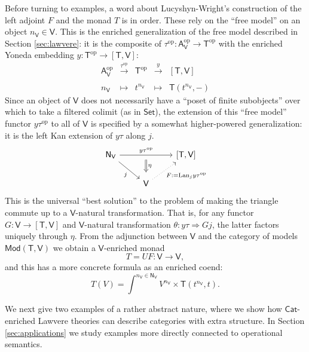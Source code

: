 \documentclass{amsart}
\theoremstyle{definition}
\newcommand{\Set}{\mathsf{Set}}
\newcommand{\Cat}{\mathsf{Cat}}
\newcommand{\Mod}{\mathsf{Mod}}
\newcommand{\NN}{\mathsf{N}}
\newcommand{\A}{\mathsf{A}}
\newcommand{\V}{\mathsf{V}}
\newcommand{\T}{\mathsf{T}}
\newcommand{\op}{\mathrm{op}}
\newcommand{\maps}{\colon}
\begin{document}
Before turning to examples, a word about Lucyshyn-Wright's construction of the left adjoint $F$ and the monad $T$ is in order.  These rely on the ``free model'' on an object $n_\V \in \V$.   This is the enriched generalization of the free model described in Section \ref{sec:lawvere}: it is the composite of $\tau^\op\maps \A_\V^\op \to \T^\op$ with the enriched Yoneda embedding $y\maps \T^\op \to [\T,\V]$:
\[
\begin{array}{rllll}
\A_\V^\op & \xrightarrow{\tau^\op} & \T^\op & \xrightarrow{y} & \left[\T,\V\right]\\
\\
n_\V & \mapsto & t^{n_\V} & \mapsto & \T(t^{n_\V},-)
\end{array}
\]
Since an object of $\V$ does not necessarily have a ``poset of finite subobjects'' over which to take a filtered colimit (as in $\Set$), the extension of this ``free model'' functor $y \tau^\op$ to all of $\V$ is specified by a somewhat higher-powered generalization: it is the left Kan extension of $y\tau$ along $j$.
\[\begin{tikzcd}
\NN_\V \arrow[rr,"y\tau^\op"{name=y}] \arrow[swap,rd,"j"] & & \left[\T,\V\right]\\
& \V \arrow[swap,dotted, ru,"F:=\mathrm{Lan}_jy\tau^{\op}"] \arrow[Rightarrow,from=y,"\eta", shorten >=0.2cm,shorten <=.2cm]
\end{tikzcd}\]
This is the universal ``best solution'' to the problem of making the triangle commute up to a $\V$-natural transformation.  That is, for any functor $G \maps \V \to [\T,\V]$ and $\V$-natural transformation $\theta \maps y\tau \Rightarrow Gj$, the latter factors uniquely through $\eta$.
From the adjunction between $\V$ and the category of models $\Mod(\T,\V)$ we obtain a $\V$-enriched monad
\[       T = U F \maps \V \to \V, \]
and this has a more concrete formula as an enriched coend:
\[
T(V) = \int^{n_\V\in \NN_\V} V^{n_\V} \times \T(t^{n_\V},t).
\]

We next give two examples of a rather abstract nature, where we show how $\Cat$-enriched Lawvere theories can describe categories with extra structure.   In Section \ref{sec:applications} we study examples more directly connected to operational semantics.
\end{document}
